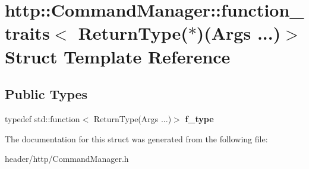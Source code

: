 \hypertarget{structhttp_1_1_command_manager_1_1function__traits_3_01_return_type_07_5_08_07_args_01_8_8_8_08_4}{}\section{http\+:\+:Command\+Manager\+:\+:function\+\_\+traits$<$ Return\+Type($\ast$)(Args ...)$>$ Struct Template Reference}
\label{structhttp_1_1_command_manager_1_1function__traits_3_01_return_type_07_5_08_07_args_01_8_8_8_08_4}
\subsection*{Public Types}
\begin{DoxyCompactItemize}
\item 
\mbox{\label{structhttp_1_1_command_manager_1_1function__traits_3_01_return_type_07_5_08_07_args_01_8_8_8_08_4_a88388662cb4f77f652df2fe76937146d}} 
typedef std\+::function$<$ Return\+Type(Args ...)$>$ {\bfseries f\+\_\+type}
\end{DoxyCompactItemize}


The documentation for this struct was generated from the following file\+:\begin{DoxyCompactItemize}
\item 
header/http/Command\+Manager.\+h\end{DoxyCompactItemize}
